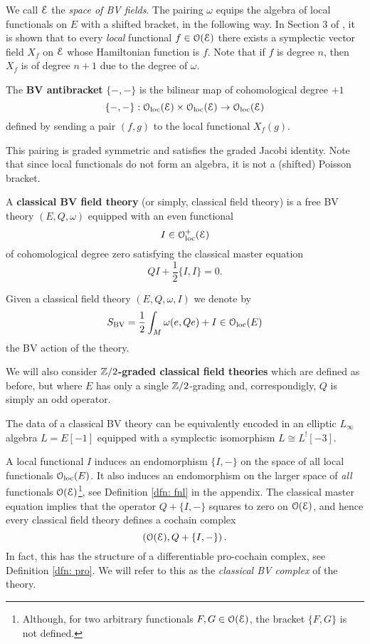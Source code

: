 \documentclass[10pt, oneside]{article}
\begin{document}
We call $\mathcal E$ the {\em space of BV fields}.  
The pairing $\omega$ equips the algebra of local functionals on $E$ with a shifted bracket, in the following way.
In Section 3 of \cite{CosRenorm}, it is shown that to every {\em local} functional $f \in \mathcal O(\mathcal E)$ there exists a symplectic vector field $X_f$ on $\mathcal E$ whose Hamiltonian function is $f$. 
Note that if $f$ is degree $n$, then $X_f$ is of degree $n+1$ due to the degree of $\omega$. 

\begin{definition}
The {\bf BV antibracket} $\{-,-\}$ is the bilinear map of cohomological degree $+1$
\[
\{-,-\} : \mathcal{O}_{\rm loc}(\mathcal E) \times \mathcal{O}_{\rm loc}(\mathcal E) \to \mathcal{O}_{\rm loc}(\mathcal E)
\]
defined by sending a pair $(f,g)$ to the local functional $X_f (g)$.
\end{definition}

This pairing is graded symmetric and satisfies the graded Jacobi identity.
Note that since local functionals do not form an algebra, it is not a (shifted) Poisson bracket. 

\begin{definition}
A {\bf classical BV field theory} (or simply, classical field theory) is a free BV theory $(E, Q, \omega)$ equipped with an even functional
\[I \in \mathcal{O}_{\rm loc}^+(\mathcal E)\]
of cohomological degree zero satisfying the classical master equation 
\[Q I + \frac{1}{2} \{I,I\} = 0 .\]
\end{definition}

Given a classical field theory $(E, Q, \omega, I)$ we denote by
\[S_{\mathrm{BV}} = \frac{1}{2} \int_M \omega(e, Q e) + I\in \mathcal{O}_{\rm loc}(E)\]
the BV action of the theory.

\begin{remark}
We will also consider {\bf $\mathbb Z/2$-graded classical field theories} which are defined as before, but where $E$ has only a single $\mathbb Z/2$-grading and, correspondigly, $Q$ is simply an odd operator.
\end{remark}

\begin{remark}
The data of a classical BV theory can be equivalently encoded in an elliptic $L_\infty$ algebra $L=E[-1]$ equipped with a symplectic isomorphism $L\cong L^![-3]$.
\end{remark}

A local functional $I$ induces an endomorphism $\{I,-\}$ on the space of all local functionals $\mathcal{O}_{\rm loc}(E)$. 
It also induces an endomorphism on the larger space of {\em all} functionals $\mathcal O(\mathcal E)$\footnote{Although, for two arbitrary functionals $F, G \in \mathcal O(\mathcal E)$, the bracket $\{F,G\}$ is not defined.}, see Definition \ref{dfn: fnl} in the appendix. 
The classical master equation implies that the operator $Q + \{I,-\}$ squares to zero on $\mathcal O(\mathcal E)$, and hence every classical field theory defines a cochain complex
\begin{equation}\label{bvcplx}
\left(\mathcal O(\mathcal E), Q + \{I,-\}\right) .
\end{equation}
In fact, this has the structure of a differentiable pro-cochain complex, see Definition \ref{dfn: pro}. 
We will refer to this as the {\em classical BV complex} of the theory. 
\end{document}
